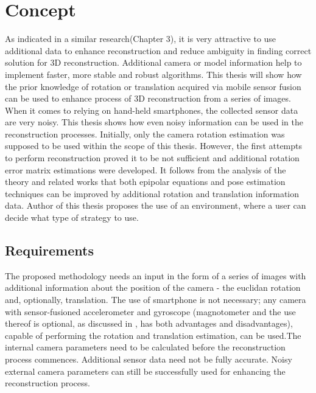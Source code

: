
\chapter{Concept} %
As indicated in a similar research(Chapter 3), it is very attractive to use additional data to enhance reconstruction and reduce ambiguity in finding correct solution for 3D reconstruction. Additional camera or model information help to implement faster, more stable and robust algorithms. This thesis will show how the prior knowledge of rotation or translation acquired via mobile sensor fusion can be used to enhance process of 3D reconstruction from a series of images. When it comes to relying on hand-held smartphones, the collected sensor data are very noisy. This thesis shows how even noisy information can be used in the reconstruction processes. Initially, only the camera rotation estimation was supposed to be used within the scope of this thesis. However, the first attempts to perform reconstruction proved it to be not sufficient and additional rotation error matrix estimations were developed.
It follows from the analysis of the theory and related works that both epipolar equations and pose estimation techniques can be improved by additional rotation and translation information data.  Author of this thesis proposes the use of an environment, where a user can decide what type of strategy to use.
\section{Requirements}
The proposed methodology needs an input in the form of a series of images with additional information about the position of the camera - the euclidan rotation and, optionally, translation. The use of smartphone is not necessary; any camera with sensor-fusioned accelerometer and gyroscope (magnotometer and the use thereof is optional, as discussed in \cite{website:androidSensorOverview}, has both advantages and disadvantages), capable of performing the rotation and translation estimation, can be used.The internal camera parameters need to be calculated before the reconstruction process commences. Additional sensor data need not be fully accurate. Noisy external camera parameters can still be successfully used for enhancing the reconstruction process.
